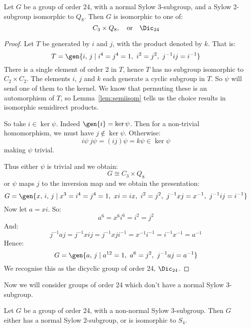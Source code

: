 \begin{lemma}
    Let \(G\) be a group of order 24, with a normal Sylow 3-subgroup, and a Sylow 2-subgroup isomorphic to \(Q_8\).
    Then \(G\) is isomorphic to one of:
    \[
        C_3 \times Q_8, \quad \text{or} \quad%
        \Dic_{24}
    \]
\end{lemma}

\begin{proof}
    Let \(T\) be generated by \(i\) and \(j\), with the product denoted by \(k\).
    That is:
    \[T = \gen{i,\,j \mid i^4 = j^4 = 1,\ i^2 = j^2,\ j^{-1}ij = i^{-1}}\]
    There is a single element of order 2 in \(T\), hence \(T\) has no subgroup isomorphic to \(C_2 \times C_2\).
    The elements \(i,\,j\) and \(k\) each generate a cyclic subgroup in \(T\).
    So \(\psi\) will send one of them to the kernel.
    We know that permuting these is an automorphism of \(T\), so Lemma~\ref{lem:semiisom} tells us the choice
    results in isomorphic semidirect products.

    So take \(i \in \ker{\psi}\).
    Indeed \(\gen{i} = \ker\psi\).
    Then for a non-trivial homomorphism, we must have \(j \notin \ker{\psi}\).
    Otherwise:
    \[i\psi\ j\psi = (ij)\psi = k\psi \in \ker{\psi}\]
    making \(\psi\) trivial.

    Thus either \(\psi\) is trivial and we obtain:
    \[G \cong C_3 \times Q_8\]
    or \(\psi\) maps \(j\) to the inversion map and we obtain the presentation:
    \[G = \gen{x,\,i,\,j \mid x^3 = i^4 = j^4 = 1,\ xi = ix,\ i^2 = j^2,\ j^{-1}xj = x^{-1},\ j^{-1}ij = i^{-1}}\]
    Now let \(a = xi\).
    So:
    \[a^6 = x^6 i^6 = i^2 = j^2\]
    And:
    \[j^{-1}aj = j^{-1}xij = j^{-1}xji^{-1} = x^{-1}i^{-1} = i^{-1}x^{-1} = a^{-1}\]
    Hence:
    \[G = \gen{a,\,j \mid a^{12} = 1,\ a^6 = j^2,\ j^{-1}aj = a^{-1}}\]
    We recognise this as the dicyclic group of order 24, \(\Dic_{24}\).
\end{proof}

Now we will consider groups of order 24 which don't have a normal Sylow 3-subgroup.

\begin{lemma}
    Let \(G\) be a group of order 24, with a non-normal Sylow 3-subgroup.
    Then \(G\) either has a normal Sylow 2-subgroup, or is isomorphic to \(S_{4}\).
\end{lemma}

